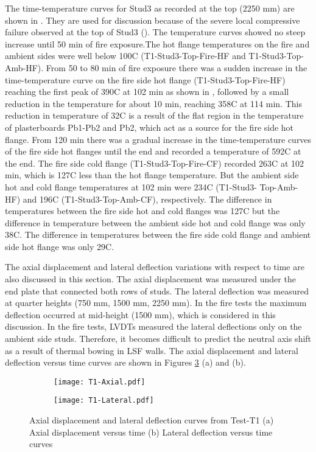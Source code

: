 The time-temperature curves for Stud3 as recorded at the top (2250 mm) are shown in . They are used for discussion because of the severe local compressive failure observed at the top of Stud3 (). The temperature curves showed no steep increase until 50 min of fire exposure.The hot flange temperatures on the fire and ambient sides were well below 100\degree C (T1-Stud3-Top-Fire-HF and T1-Stud3-Top-Amb-HF). From 50 to 80 min of fire exposure there was a sudden increase in the time-temperature curve on the fire side hot flange (T1-Stud3-Top-Fire-HF) reaching the first peak of 390\degree C at 102 min as shown in , followed by a small reduction in the temperature for about 10 min, reaching 358\degree C at 114 min. This reduction in temperature of 32\degree C is a result of the flat region in the temperature of plasterboards Pb1-Pb2 and Pb2, which act as a source for the fire side hot flange. From 120 min there was a gradual increase in the time-temperature curves of the fire side hot flanges until the end and recorded a temperature of 592\degree C at the end. The fire side cold flange (T1-Stud3-Top-Fire-CF) recorded 263\degree C at 102 min, which is 127\degree C less than the hot flange temperature. But the ambient side hot and cold flange temperatures at 102 min were 234\degree C (T1-Stud3- Top-Amb-HF) and 196\degree C (T1-Stud3-Top-Amb-CF), respectively. The difference in temperatures between the fire side hot and cold flanges was 127\degree C but the difference in temperature between the ambient side hot and cold flange was only 38\degree C. The difference in temperatures between the fire side cold flange and ambient side hot flange was only 29\degree C.

The axial displacement and lateral deflection variations with respect to time are also discussed in this section. The axial displacement was measured under the end plate that connected both rows of studs. The lateral deflection was measured at quarter heights (750 mm, 1500 mm, 2250 mm). In the fire tests the maximum deflection occurred at mid-height (1500 mm), which is considered in this discussion. In the fire tests, LVDTs measured the lateral deflections only on the ambient side studs. Therefore, it becomes difficult to predict the neutral axis shift as a result of thermal bowing in LSF walls. The axial displacement and lateral deflection versus time curves are shown in Figures \ref{fig:T1-Axial-Lateral} (a) and (b).
\begin{figure}[!htbp]
	\centering
	\begin{subfigure}[b]{0.7\textwidth}
		\centering
		\texttt{[image: T1-Axial.pdf]}
		\caption{}
		\label{subfig:T1-Axial}
	\end{subfigure}
	\begin{subfigure}[b]{0.7\textwidth}
		\centering
		\texttt{[image: T1-Lateral.pdf]}
		\caption{}
		\label{subfig:T1-Lateral}
	\end{subfigure}
	   \caption{Axial displacement and lateral deflection curves from Test-T1 (a) Axial displacement versus time (b) Lateral deflection versus time curves}
	   \label{fig:T1-Axial-Lateral}
\end{figure}

